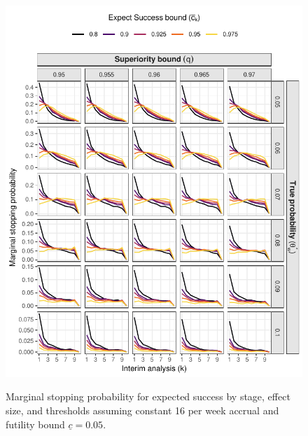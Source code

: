 \documentclass{bmcart}
\begin{document}
\begin{figure}[!ht]
	\caption{Marginal stopping probability for expected success by stage, effect size, and thresholds assuming constant 16 per week accrual and futility bound $\underline{c}=0.05$.}
	\includegraphics{stop_expect_success_16.pdf}
	\label{fig:stop_expect_success_16}
\end{figure}
\end{document}
